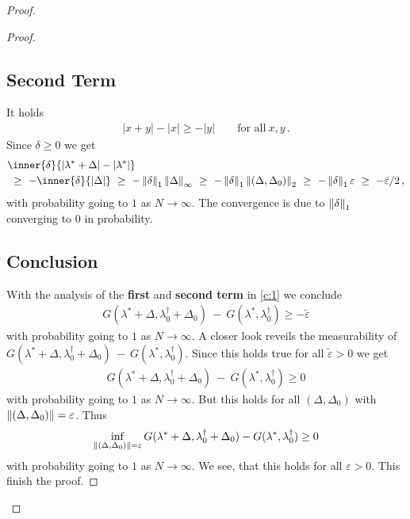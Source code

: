 \begin{proof}
\begin{proof}
\subsection*{Second Term}
It holds
\begin{gather*}
  |x+y|-|x|\ge
  -|y|
  \qquad
  \text{for all}\ 
  x,y
  \,.
\end{gather*}
Since
$\delta\ge 0$
we get
\begin{align*}
  &
     \inner
     {\delta}
     {
       |\lambda^*+\Delta|
       -
       |\lambda^*|
     }
     \\
     &
     \ 
     \ge
     \ 
     -
     \inner{\delta}
     {|\Delta|}
     \ 
     \ge
     \ 
     -
     \norm{\delta}_1
     \norm{\Delta}_\infty
     \ 
     \ge
     \ 
     -
     \norm{\delta}_1
     \norm{(\Delta,\Delta_0)}_2
     \ 
     \ge
     \ 
     -
     \norm{\delta}_1
     \varepsilon
     \ 
     \ge
     \ 
     -
     \tilde{\varepsilon}/2
     \,,
\end{align*}
with probability going to $1$ as $N\to \infty$.
The convergence is due to $\left\lVert\delta\right\rVert_1$ converging to $0$ in probability.
\subsection*{Conclusion}
With the analysis of the \textbf{first} and \textbf{second term} in
\eqref{c:1} we conclude
\begin{gather}
  G
     (
     \lambda^*
      +
      \Delta
      ,
      \lambda^\dagger_0
      +
     \Delta_0
     )
     \ 
     -
     \ 
     G
     (
     \lambda^*,
      \lambda^\dagger_0
     )
     \ge
     -
     \tilde{\varepsilon}
\end{gather}
with probability going to $1$ as $N\to \infty$.
A closer look reveils the measurability of 
$
  G
     (
     \lambda^*
      +
      \Delta
      ,
      \lambda^\dagger_0
      +
     \Delta_0
     )
     \ 
     -
     \ 
     G
     (
     \lambda^*,
      \lambda^\dagger_0
     )
$.
Since this holds true for all $\tilde{\varepsilon}>0$ we get
\begin{gather}
  G
     (
     \lambda^*
      +
      \Delta
      ,
      \lambda^\dagger_0
      +
     \Delta_0
     )
     \ 
     -
     \ 
     G
     (
     \lambda^*,
      \lambda^\dagger_0
     )
     \ge
     0
\end{gather}
with probability going to $1$ as $N\to \infty$.
But this holds for all 
$
(\Delta,\Delta_0)
$
with 
$
\left\lVert
(\Delta,\Delta_0)
\right\rVert
=\varepsilon
$. Thus
\begin{gather}
   \inf _ { 
       \left\lVert
         (
     \Delta
     ,
     \Delta_0
         )
 \right\rVert 
= \varepsilon }
     G
     (
     \lambda^*
      +
      \Delta
      ,
      \lambda^\dagger_0
      +
     \Delta_0
     )
     -
     G
     (
     \lambda^*,
      \lambda^\dagger_0
     )
     \ge 
     0
\end{gather}
with probability going to $1$ as $N\to \infty$.
We see, that this holds for all $\varepsilon>0$. This finish the proof.
 \end{proof}

\end{proof}

